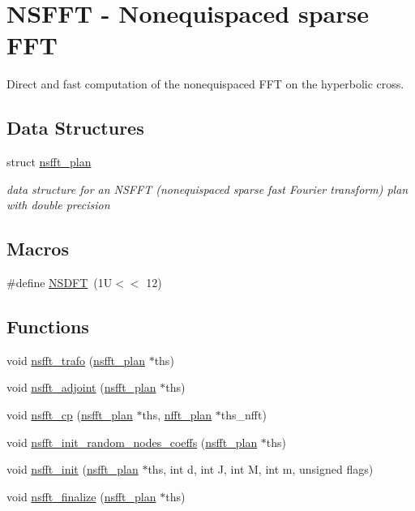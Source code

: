 \hypertarget{group__nsfft}{\section{N\-S\-F\-F\-T -\/ Nonequispaced sparse F\-F\-T}
\label{group__nsfft}
}


Direct and fast computation of the nonequispaced F\-F\-T on the hyperbolic cross.  


\subsection*{Data Structures}
\begin{DoxyCompactItemize}
\item 
struct \hyperlink{structnsfft__plan}{nsfft\-\_\-plan}
\begin{DoxyCompactList}\small\item\em data structure for an N\-S\-F\-F\-T (nonequispaced sparse fast Fourier transform) plan with double precision \end{DoxyCompactList}\end{DoxyCompactItemize}
\subsection*{Macros}
\begin{DoxyCompactItemize}
\item 
\#define \hyperlink{group__nsfft_ga3a5a1f8be42adf0575f0e0c4b8e0a32a}{N\-S\-D\-F\-T}~(1\-U$<$$<$ 12)
\end{DoxyCompactItemize}
\subsection*{Functions}
\begin{DoxyCompactItemize}
\item 
void \hyperlink{group__nsfft_gaee06e4a864e22e2c41f71606a8e2644e}{nsfft\-\_\-trafo} (\hyperlink{structnsfft__plan}{nsfft\-\_\-plan} $\ast$ths)
\item 
void \hyperlink{group__nsfft_gab3de4bceeffaea05a29daf75cad04d38}{nsfft\-\_\-adjoint} (\hyperlink{structnsfft__plan}{nsfft\-\_\-plan} $\ast$ths)
\item 
void \hyperlink{group__nsfft_gaa90a04e2110e52bedb70382704f3f004}{nsfft\-\_\-cp} (\hyperlink{structnsfft__plan}{nsfft\-\_\-plan} $\ast$ths, \hyperlink{structnfft__plan}{nfft\-\_\-plan} $\ast$ths\-\_\-nfft)
\item 
void \hyperlink{group__nsfft_ga7cbc20c44eeecadc5c30f4159616f30a}{nsfft\-\_\-init\-\_\-random\-\_\-nodes\-\_\-coeffs} (\hyperlink{structnsfft__plan}{nsfft\-\_\-plan} $\ast$ths)
\item 
void \hyperlink{group__nsfft_ga1b7f87f960cb22420a933e915c539aaf}{nsfft\-\_\-init} (\hyperlink{structnsfft__plan}{nsfft\-\_\-plan} $\ast$ths, int d, int J, int M, int m, unsigned flags)
\item 
void \hyperlink{group__nsfft_gaef170ad12eff8fde1c78bc6071142b36}{nsfft\-\_\-finalize} (\hyperlink{structnsfft__plan}{nsfft\-\_\-plan} $\ast$ths)
\end{DoxyCompactItemize}


